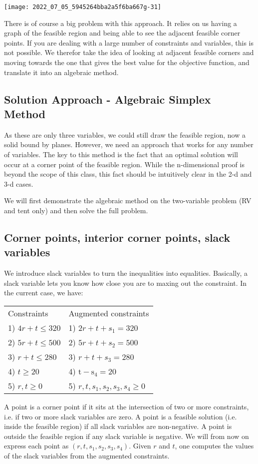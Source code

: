 \texttt{[image: 2022\_07\_05\_5945264bba2a5f6ba667g-31]}

There is of course a big problem with this approach. It relies on us having a graph of the feasible region and being able to see the adjacent feasible corner points. If you are dealing with a large number of constraints and variables, this is not possible. We therefor take the idea of looking at adjacent feasible corners and moving towards the one that gives the best value for the objective function, and translate it into an algebraic method.

\subsection{Solution Approach - Algebraic Simplex Method}
As these are only three variables, we could still draw the feasible region, now a solid bound by planes. However, we need an approach that works for any number of variables. The key to this method is the fact that an optimal solution will occur at a corner point of the feasible region. While the n-dimensional proof is beyond the scope of this class, this fact should be intuitively clear in the 2-d and 3-d cases.

We will first demonstrate the algebraic method on the two-variable problem (RV and tent only) and then solve the full problem.

\subsection{Corner points, interior corner points, slack variables}
We introduce slack variables to turn the inequalities into equalities. Basically, a slack variable lets you know how close you are to maxing out the constraint. In the current case, we have:

\begin{tabular}{ll}
Constraints &
Augmented constraints\\
1) $4 r+t \leq 320$ &
1) $2 r+t+s_{1}=320$\\
2) $5 r+t \leq 500$&
2) $5 r+t+s_{2}=500$\\
3) $r+t \leq 280$&
3) $r+t+s_{3}=280$\\
4) $t \geq 20$&
4) $\mathrm{t}-\mathrm{s}_{4}=20$\\
5) $r, t \geq 0$&
5) $r, t, s_{1}, s_{2}, s_{3}, s_{4} \geq 0$
\end{tabular}

A point is a corner point if it sits at the intersection of two or more constraints, i.e. if two or more slack variables are zero. A point is a feasible solution (i.e. inside the feasible region) if all slack variables are non-negative. A point is outside the feasible region if any slack variable is negative. We will from now on express each point as $\left(r, t, s_{1}, s_{2}, s_{3}, s_{4}\right)$. Given $r$ and $t$, one computes the values of the slack variables from the augmented constraints.

